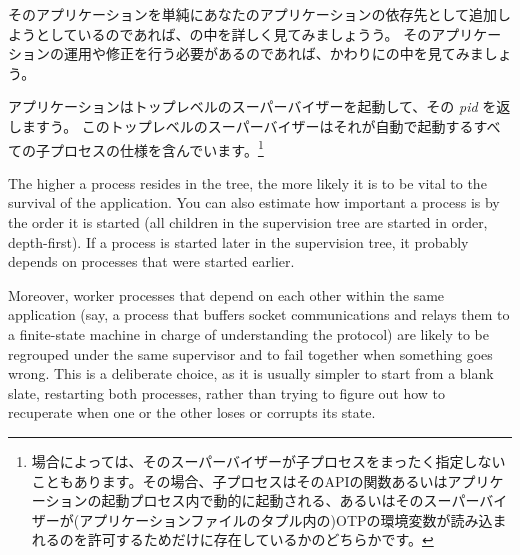 そのアプリケーションを単純にあなたのアプリケーションの依存先として追加しようとしているのであれば、の中を詳しく見てみましょうう。
そのアプリケーションの運用や修正を行う必要があるのであれば、かわりにの中を見てみましょう。

アプリケーションはトップレベルのスーパーバイザーを起動して、その \emph{pid} を返しますう。
このトップレベルのスーパーバイザーはそれが自動で起動するすべての子プロセスの仕様を含んでいます。\footnote{場合によっては、そのスーパーバイザーが子プロセスをまったく指定しないこともあります。その場合、子プロセスはそのAPIの関数あるいはアプリケーションの起動プロセス内で動的に起動される、あるいはそのスーパーバイザーが(アプリケーションファイルのタプル内の)OTPの環境変数が読み込まれるのを許可するためだけに存在しているかのどちらかです。}

The higher a process resides in the tree, the more likely it is to be vital to the survival of the application. You can also estimate how important a process is by the order it is started (all children in the supervision tree are started in order, depth-first). If a process is started later in the supervision tree, it probably depends on processes that were started earlier.

Moreover, worker processes that depend on each other within the same application (say, a process that buffers socket communications and relays them to a finite-state machine in charge of understanding the protocol) are likely to be regrouped under the same supervisor and to fail together when something goes wrong. This is a deliberate choice, as it is usually simpler to start from a blank slate, restarting both processes, rather than trying to figure out how to recuperate when one or the other loses or corrupts its state.

